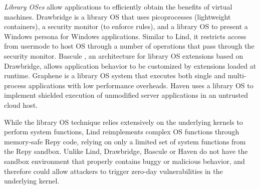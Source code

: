 \textit{Library OSes}
allow applications to efficiently
obtain the benefits of virtual machines.
%
Drawbridge \cite{Drawbridge-11} is a library OS that uses picoprocesses
(lightweight containers), a security monitor (to enforce rules),
and a library OS to present a Windows persona for %
Windows applications. Similar to Lind,
it restricts access from usermode to host OS through a number
of operations that pass through the security monitor.
%
%
Bascule \cite{Bascule}, an architecture for library OS extensions
based on Drawbridge, allows application behavior to be customized by
extensions loaded at runtime.
Graphene \cite{Graphene-14} is a library OS system that
executes both single and
multi-process applications with low performance overheads.
Haven \cite{Haven} uses a library OS to implement
shielded execution of unmodified server applications
in an untrusted cloud host.

While the library OS technique relies extensively on
the underlying kernels to perform system functions,
Lind reimplements complex OS functions through memory-safe Repy
code, relying on only a limited set of system functions from the Repy
sandbox. Unlike Lind, Drawbridge, Bascule or Haven
do not have the sandbox environment that properly contains
buggy or malicious behavior, and therefore could allow attackers
to trigger zero-day vulnerabilities in the underlying kernel.


